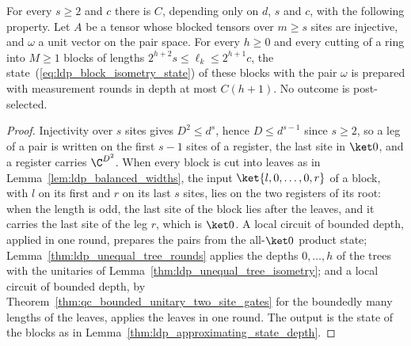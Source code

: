\begin{lemma}
    \label{thm:ldp_unequal_blocks_measurements}
    \leanok
    For every $s\ge2$ and $c$ there is $C$, depending only on $d$, $s$ and $c$,
    with the following property. Let $A$ be a tensor whose blocked tensors over
    $m\ge s$ sites are injective, and $\omega$ a unit vector on the pair space.
    For every $h\ge0$ and every cutting of a ring into $M\ge1$ blocks of lengths
    $2^{h+2}s\le\ell_k\le2^{h+1}c$, the state~(\ref{eq:ldp_block_isometry_state})
    of these blocks with the pair $\omega$ is prepared with measurement rounds in
    depth at most $C(h+1)$. No outcome is post-selected.
\end{lemma}
\begin{proof}
    \leanok
    Injectivity over $s$ sites gives $D^2\le d^s$, hence $D\le d^{s-1}$ since
    $s\ge2$, so a leg of a pair is written on the first $s-1$ sites of a
    register, the last site in $\ket0$, and a register carries $\C^{D^2}$. When
    every block is cut into leaves as in Lemma~\ref{lem:ldp_balanced_widths}, the input
    $\ket{l,0,\dots,0,r}$ of a block, with $l$ on its first and $r$ on its last
    $s$ sites, lies on the two registers of its root: when the length is odd,
    the last site of the block lies after the leaves, and it carries the last
    site of the leg $r$, which is $\ket0$. A local circuit of bounded depth,
    applied in one round, prepares the pairs from the all-$\ket0$ product
    state; Lemma~\ref{thm:ldp_unequal_tree_rounds} applies the depths
    $0,\dots,h$ of the trees with the unitaries of
    Lemma~\ref{thm:ldp_unequal_tree_isometry}; and a local circuit of
    bounded depth, by Theorem~\ref{thm:qc_bounded_unitary_two_site_gates} for
    the boundedly many lengths of the leaves, applies the leaves in one round.
    The output is the state of the blocks as in
    Lemma~\ref{thm:ldp_approximating_state_depth}.
\end{proof}

